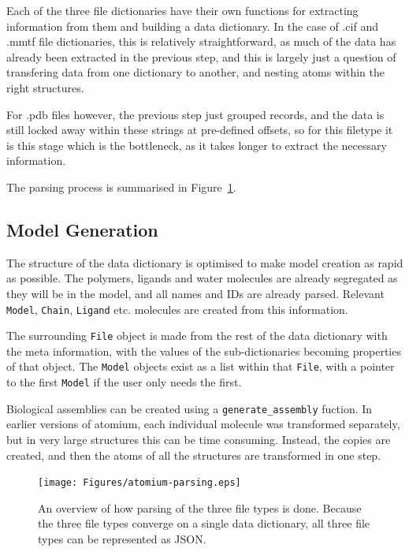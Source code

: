 Each of the three file dictionaries have their own functions for extracting information from them and building a data dictionary. In the case of .cif and .mmtf file dictionaries, this is relatively straightforward, as much of the data has already been extracted in the previous step, and this is largely just a question of transfering data from one dictionary to another, and nesting atoms within the right structures.

For .pdb files however, the previous step just grouped records, and the data is still locked away within these strings at pre-defined offsets, so for this filetype it is this stage which is the bottleneck, as it takes longer to extract the necessary information.

The parsing process is summarised in Figure~\ref{fig:atomium-parsing}.

\subsection{Model Generation}

The structure of the data dictionary is optimised to make model creation as rapid as possible. The polymers, ligands and water molecules are already segregated as they will be in the model, and all names and IDs are already parsed. Relevant \texttt{Model}, \texttt{Chain}, \texttt{Ligand} etc. molecules are created from this information.

The surrounding \texttt{File} object is made from the rest of the data dictionary with the meta information, with the values of the sub-dictionaries becoming properties of that object. The \texttt{Model} objects exist as a list within that \texttt{File}, with a pointer to the first \texttt{Model} if the user only needs the first.

Biological assemblies can be created using a \texttt{generate\_assembly} fuction. In earlier versions of atomium, each individual molecule was transformed separately, but in very large structures this can be time consuming. Instead, the copies are created, and then the atoms of all the structures are transformed in one step.

\begin{figure}
\centering
\texttt{[image: Figures/atomium-parsing.eps]}
\caption[atomium parsing.]{\label{fig:atomium-parsing} An overview of how parsing of the three file types is done. Because the three file types converge on a single data dictionary, all three file types can be represented as JSON.}
\end{figure}

